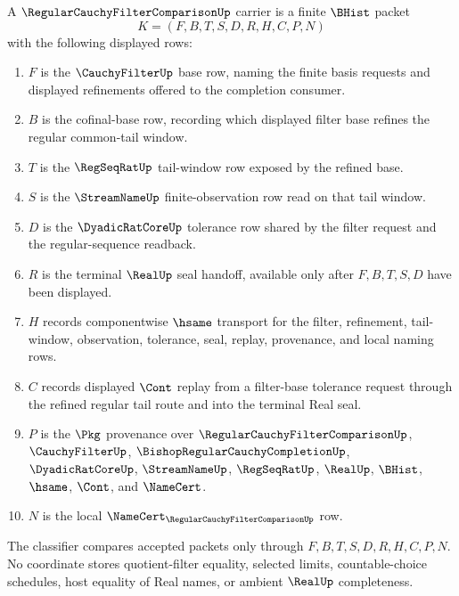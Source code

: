 \begin{definition}
\label{def:regular-cauchy-filter-comparison-carrier}
A $\RegularCauchyFilterComparisonUp$ carrier is a finite $\BHist$ packet
$$
K=(F,B,T,S,D,R,H,C,P,N)
$$
with the following displayed rows:
\begin{enumerate}
\item $F$ is the $\CauchyFilterUp$ base row, naming the finite basis requests and displayed refinements offered to the completion consumer.
\item $B$ is the cofinal-base row, recording which displayed filter base refines the regular common-tail window.
\item $T$ is the $\RegSeqRatUp$ tail-window row exposed by the refined base.
\item $S$ is the $\StreamNameUp$ finite-observation row read on that tail window.
\item $D$ is the $\DyadicRatCoreUp$ tolerance row shared by the filter request and the regular-sequence readback.
\item $R$ is the terminal $\RealUp$ seal handoff, available only after $F,B,T,S,D$ have been displayed.
\item $H$ records componentwise $\hsame$ transport for the filter, refinement, tail-window, observation, tolerance, seal, replay, provenance, and local naming rows.
\item $C$ records displayed $\Cont$ replay from a filter-base tolerance request through the refined regular tail route and into the terminal Real seal.
\item $P$ is the $\Pkg$ provenance over $\RegularCauchyFilterComparisonUp$, $\CauchyFilterUp$, $\BishopRegularCauchyCompletionUp$, $\DyadicRatCoreUp$, $\StreamNameUp$, $\RegSeqRatUp$, $\RealUp$, $\BHist$, $\hsame$, $\Cont$, and $\NameCert$.
\item $N$ is the local $\NameCert_{\RegularCauchyFilterComparisonUp}$ row.
\end{enumerate}
The classifier compares accepted packets only through $F,B,T,S,D,R,H,C,P,N$. No coordinate stores quotient-filter equality, selected limits, countable-choice schedules, host equality of Real names, or ambient $\RealUp$ completeness.
\end{definition}

